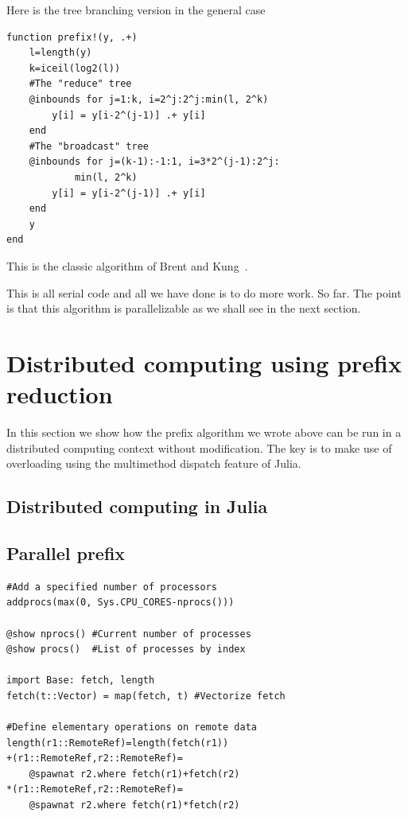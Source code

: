 \documentclass{sig-alternate}
\begin{document}
Here is the tree branching version in the general case

\begin{verbatim}
function prefix!(y, .+)
    l=length(y)
    k=iceil(log2(l))
    #The "reduce" tree
    @inbounds for j=1:k, i=2^j:2^j:min(l, 2^k)
        y[i] = y[i-2^(j-1)] .+ y[i]
    end
    #The "broadcast" tree
    @inbounds for j=(k-1):-1:1, i=3*2^(j-1):2^j:
            min(l, 2^k)
        y[i] = y[i-2^(j-1)] .+ y[i]
    end
    y
end
\end{verbatim}

This is the classic algorithm of Brent and Kung~\cite{Brent1982}.

This is all serial code and all we have done is to do more work. So far. The point is that this algorithm is parallelizable as we shall see in the next section.

\section{Distributed computing using prefix reduction}

In this section we show how the prefix algorithm we wrote above can be run in a distributed computing context without modification. The key is to make use of overloading using the multimethod dispatch feature of Julia.

\subsection{Distributed computing in Julia}

\subsection{Parallel prefix}

\begin{verbatim}
#Add a specified number of processors
addprocs(max(0, Sys.CPU_CORES-nprocs()))

@show nprocs() #Current number of processes
@show procs()  #List of processes by index

import Base: fetch, length
fetch(t::Vector) = map(fetch, t) #Vectorize fetch

#Define elementary operations on remote data
length(r1::RemoteRef)=length(fetch(r1))
+(r1::RemoteRef,r2::RemoteRef)=
    @spawnat r2.where fetch(r1)+fetch(r2)
*(r1::RemoteRef,r2::RemoteRef)=
    @spawnat r2.where fetch(r1)*fetch(r2)
\end{verbatim}
\end{document}
